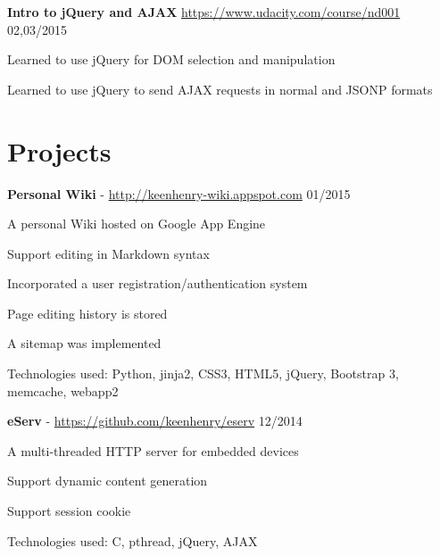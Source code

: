 \documentclass[margin,line]{resume}
\begin{document}
\begin{resume}
    \textbf{Intro to jQuery and AJAX} \url{https://www.udacity.com/course/nd001} \hfill 02,03/2015 \vspace{-3mm}\\\vspace{-1mm}%
      \begin{list2}
       \item Learned to use jQuery for DOM selection and manipulation
       \item Learned to use jQuery to send AJAX requests in normal and JSONP formats
      \end{list2}
    \vspace{-2mm}

    \section{\myheadingstyle Projects}

    \textbf{Personal Wiki} - \url{http://keenhenry-wiki.appspot.com} \hfill 01/2015 \vspace{-3mm}\\\vspace{-1mm}%
      \begin{list2}
       \item A personal Wiki hosted on Google App Engine
       \item Support editing in Markdown syntax
       \item Incorporated a user registration/authentication system
       \item Page editing history is stored
       \item A sitemap was implemented
       \item Technologies used: Python, jinja2, CSS3, HTML5, jQuery, Bootstrap 3, memcache, webapp2
      \end{list2}

    \textbf{eServ} - \url{https://github.com/keenhenry/eserv} \hfill 12/2014 \vspace{-3mm}\\\vspace{-1mm}%
      \begin{list2}
       \item A multi-threaded HTTP server for embedded devices
       \item Support dynamic content generation
       \item Support session cookie
       \item Technologies used: C, pthread, jQuery, AJAX
      \end{list2}


\end{resume}
\end{document}
